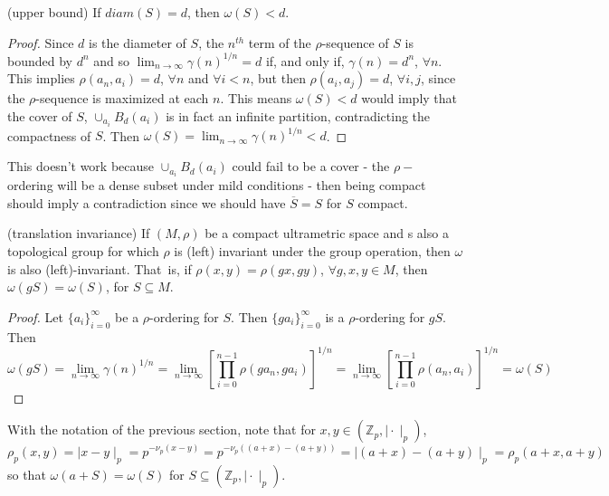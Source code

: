 \begin{proposition}
	(upper bound) If $diam(S) = d$, then $\omega(S) < d$.
\end{proposition}

\begin{proof}
	Since $d$ is the diameter of $S$, the $n^{th}$ term of the $\rho$-sequence of $S$ is bounded by $d^n$ and so $ \lim_{n\to\infty} \gamma(n)^{1/n}=d$ if, and only if, $\gamma(n)=d^n$, $\forall n$. This implies $\rho(a_n, a_i) = d$, $\forall n$ and $\forall i < n$, but then $\rho(a_i,a_j)=d$, $\forall i,j$, since the $\rho$-sequence is maximized at each $n$. This means $\omega(S) < d$ would imply that the cover of $S$, $\cup_{a_i} B_d(a_i)$ is in fact an infinite partition, contradicting the compactness of $S$. Then  $\omega(S)= \lim_{n\to\infty} \gamma(n)^{1/n}<d$. 
\end{proof}

This doesn't work because  $\cup_{a_i} B_d(a_i)$  could fail to be a cover - the $\rho-$ ordering will be a dense subset under mild conditions - then being compact should imply a contradiction since we should have $\overline{S}=S$ for $S$ compact.


\begin{proposition}
\label{translation invariance}
	(translation invariance) If $(M, \rho)$ be a compact ultrametric space and s also a topological group for which $\rho$ is (left) invariant under the group operation, then $\omega$ is also (left)-invariant. That\ is, if $\rho(x,y)=\rho(gx,gy)$, $ \forall g,x,y \in M$, then $\omega(gS)=\omega(S)$, for $S \subseteq M$.	
\end{proposition}

\begin{proof}
	Let $\{a_i\}_{i=0}^\infty$ be a $\rho$-ordering for $S$. Then $\{ga_i\}_{i=0}^\infty$ is a $\rho$-ordering for $gS$. Then $$\omega(gS) = \lim_{n\to\infty} \gamma(n)^{1/n} =  \lim_{n\to\infty} [\prod_{i=0}^{n-1} \rho(ga_n,ga_i)]^{1/n} = \lim_{n\to\infty} [\prod_{i=0}^{n-1} \rho(a_n,a_i)]^{1/n}	 = \omega(S)$$
\end{proof}	

\begin{example}
	With the notation of the previous section, note that for $x,y \in (\mathbb{Z}_p, \mid \cdot \mid_p)$, $\rho_p(x,y) = \mid x - y \mid_p = p^{-\nu_p(x-y)} = p^{-\nu_p((a+x)-(a+y))} =  \mid (a+x) - (a+y) \mid_p = \rho_p(a+x,a+y)$ so that $\omega(a+S) = \omega(S)$ for $S \subseteq (\mathbb{Z}_p, \mid \cdot \mid_p)$.
\end{example}

